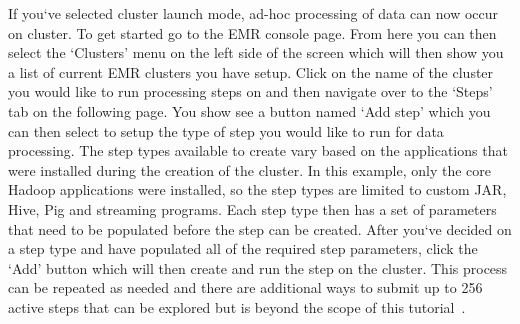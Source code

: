 If you`ve selected cluster launch mode, ad-hoc processing of data can now 
occur on cluster. To get started go to the EMR console page. From here you can 
then select the `Clusters' menu on the left side of the screen which will 
then show you a list of current EMR clusters you have setup. Click on the 
name of the cluster you would like to run processing steps on and then navigate 
over to the `Steps' tab on the following page. You show see a button named 
`Add step' which you can then select to setup the type of step you would like to 
run for data processing. The step types available to create vary based on the 
applications that were installed during the creation of the cluster. In this 
example, only the core Hadoop applications were installed, so the step types 
are limited to custom JAR, Hive, Pig and streaming programs. Each step type 
then has a set of parameters that need to be populated before the step can be 
created. After you`ve decided on a step type and have populated all of the 
required step parameters, click the `Add' button which will then create and 
run the step on the cluster. This process can be repeated as needed and there 
are additional ways to submit up to 256 active steps that can be explored but 
is beyond the scope of this tutorial~\cite{hid-sp18-521-emrprocess}.  

